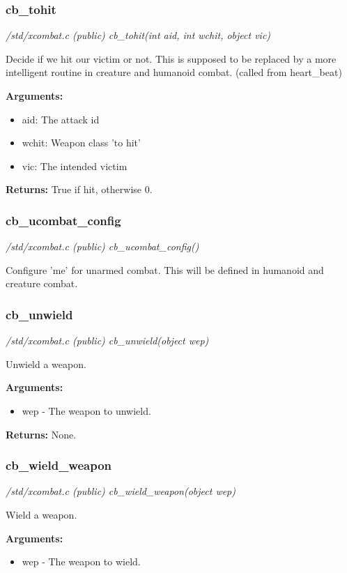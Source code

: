 \subsubsection{cb\_tohit}

{\em /std/xcombat.c (public) cb\_tohit(int aid, int wchit, object vic)}

Decide if we hit our victim or not. This is supposed to be
replaced by a more intelligent routine in creature and
humanoid combat. (called from heart\_beat)

{\bf Arguments:}
\begin{itemize}
\item      aid:   The attack id
\item wchit: Weapon class 'to hit'
\item vic:   The intended victim
\end{itemize}

{\bf Returns:}        True if hit, otherwise 0.


\subsubsection{cb\_ucombat\_config}

{\em /std/xcombat.c (public) cb\_ucombat\_config()}

Configure 'me' for unarmed combat. This will be 
defined in humanoid and creature combat.


\subsubsection{cb\_unwield}

{\em /std/xcombat.c (public) cb\_unwield(object wep)}

Unwield a weapon.

{\bf Arguments:}
\begin{itemize}
\item     wep - The weapon to unwield.
\end{itemize}

{\bf Returns:}        None.


\subsubsection{cb\_wield\_weapon}

{\em /std/xcombat.c (public) cb\_wield\_weapon(object wep)}

Wield a weapon.

{\bf Arguments:}
\begin{itemize}
\item     wep - The weapon to wield.
\end{itemize}

